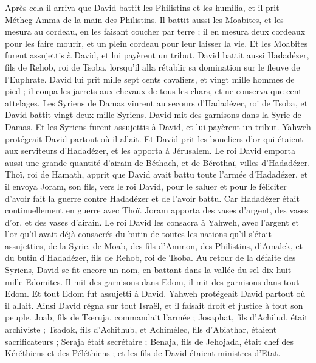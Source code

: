 \begin{multicols}{2}
\VerseOne{}Après cela il arriva que David battit les Philistins et les humilia, et il prit Métheg-Amma de la main des Philistins.
Il battit aussi les Moabites, et les mesura au cordeau, en les faisant coucher par terre ; il en mesura deux cordeaux pour les faire mourir, et un plein cordeau pour leur laisser la vie. Et les Moabites furent assujettis à David, et lui payèrent un tribut.
David battit aussi Hadadézer, fils de Rehob, roi de Tsoba, lorsqu’il alla rétablir sa domination sur le fleuve de l’Euphrate.
David lui prit mille sept cents cavaliers, et vingt mille hommes de pied ; il coupa les jarrets aux chevaux de tous les chars, et ne conserva que cent attelages.
Les Syriens de Damas vinrent au secours d'Hadadézer, roi de Tsoba, et David battit vingt-deux mille Syriens.
David mit des garnisons dans la Syrie de Damas. Et les Syriens furent assujettis à David, et lui payèrent un tribut. Yahweh protégeait David partout où il allait.
Et David prit les boucliers d'or qui étaient aux serviteurs d'Hadadézer, et les apporta à Jérusalem.
Le roi David emporta aussi une grande quantité d’airain de Béthach, et de Bérothaï, villes d'Hadadézer.
Thoï, roi de Hamath, apprit que David avait battu toute l’armée d’Hadadézer,
et il envoya Joram, son fils, vers le roi David, pour le saluer et pour le féliciter d’avoir fait la guerre contre Hadadézer et de l’avoir battu. Car Hadadézer était continuellement en guerre avec Thoï. Joram apporta des vases d'argent, des vases d'or, et des vases d’airain.
Le roi David les consacra à Yahweh, avec l'argent et l'or qu'il avait déjà consacrés du butin de toutes les nations qu'il s'était assujetties,
de la Syrie, de Moab, des fils d’Ammon, des Philistins, d’Amalek, et du butin d'Hadadézer, fils de Rehob, roi de Tsoba.
Au retour de la défaite des Syriens, David se fit encore un nom, en battant dans la vallée du sel dix-huit mille Edomites.
Il mit des garnisons dans Edom, il mit des garnisons dans tout Edom. Et tout Edom fut assujetti à David. Yahweh protégeait David partout où il allait.
Ainsi David régna sur tout Israël, et il faisait droit et justice à tout son peuple.
Joab, fils de Tseruja, commandait l'armée ; Josaphat, fils d'Achilud, était archiviste ;
Tsadok, fils d'Achithub, et Achimélec, fils d'Abiathar, étaient sacrificateurs ; Seraja était secrétaire ;
Benaja, fils de Jehojada, était chef des Kéréthiens et des Péléthiens ; et les fils de David étaient ministres d’Etat.

\end{multicols}
